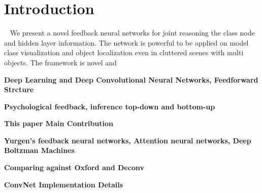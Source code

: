\section{Introduction}

~\cite{a}
We present a novel feedback neural networks for joint reasoning the class node and hidden layer information. The network is powerful to be applied on model class visualization and object localization even in cluttered scenes with multi objects. The framework is novel and 

\textbf{Deep Learning and Deep Convolutional Neural Networks, Feedforward Strcture}

\textbf{Psychological feedback, inference top-down and bottom-up}

\textbf{This paper Main Contribution}

\textbf{Yurgen's feedback neural networks, Attention neural networks, Deep Boltzman Machines}

\textbf{Comparing against Oxford and Deconv}

\textbf{ConvNet Implementation Details}
